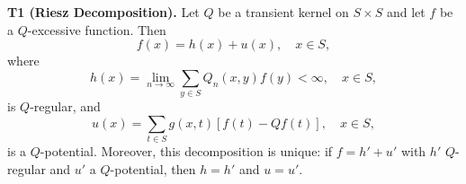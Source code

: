\textbf{T1 (Riesz Decomposition).} Let $Q$ be a transient kernel on $S \times S$ and let $f$ be a $Q$-excessive function. Then
$$f(x) = h(x) + u(x), \quad x \in S,$$
where
$$h(x) = \lim_{n \to \infty} \sum_{y \in S} Q_n(x,y)f(y) < \infty, \quad x \in S,$$
is $Q$-regular, and
$$u(x) = \sum_{t \in S} g(x,t)[f(t) - Qf(t)], \quad x \in S,$$
is a $Q$-potential. Moreover, this decomposition is unique: if $f = h' + u'$ with $h'$ $Q$-regular and $u'$ a $Q$-potential, then $h = h'$ and $u = u'$.
